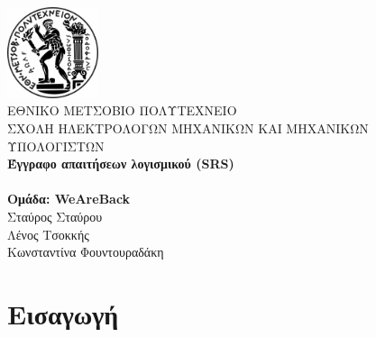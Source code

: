\documentclass[a4paper,12pt, oneside]{article}
\begin{document}
\makeatletter
\renewcommand\paragraph{\@startsection{paragraph}{4}{\z@}%
            {-2.5ex\@plus -1ex \@minus -.25ex}%
            {1.25ex \@plus .25ex}%
            {\normalfont\normalsize\bfseries}}
\makeatother
\setcounter{secnumdepth}{4} %
\setcounter{tocdepth}{4}    %



\begin{titlepage}
\begin{center}

\includegraphics[width=0.20\textwidth]{./img/NTUAlogo.jpg}~\\[0.1cm]
\textsc{ ΕΘΝΙΚΟ ΜΕΤΣΟΒΙΟ ΠΟΛΥΤΕΧΝΕΙΟ}\\[0.2cm]  
\textsc{ ΣΧΟΛΗ ΗΛΕΚΤΡΟΛΟΓΩΝ ΜΗΧΑΝΙΚΩΝ ΚΑΙ ΜΗΧΑΝΙΚΩΝ ΥΠΟΛΟΓΙΣΤΩΝ}\\[3cm] 


\textbf{\LARGE Έγγραφο απαιτήσεων λογισμικού\textlatin{ (SRS)}}\\[0.01cm]
\\[2cm]


\textbf{Ομάδα:  \textlatin{WeAreBack}}\\
	Σταύρος Σταύρου \\
	Λένος Τσοκκής \\ 
	Κωνσταντίνα Φουντουραδάκη
\vfill

\end{center} 
\end{titlepage}

\thispagestyle{empty}
\newpage

\thispagestyle{empty}
\setcounter{page}{2}
\tableofcontents
\clearpage
\listoffigures
\newpage


\section{Εισαγωγή}
\end{document}
